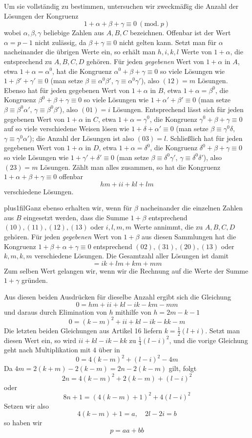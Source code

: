 Um sie vollständig zu bestimmen, untersuchen wir zweckmäßig die Anzahl der Lösungen der Kongruenz
\[
1+\alpha+\beta+\gamma\equiv0\ (\mathrm{mod.}\ p)
\]
wobei $\alpha,\beta,\gamma$ beliebige Zahlen aus $A,B,C$ bezeichnen. Offenbar ist der Wert $\alpha=p-1$ nicht zulässig, da $\beta+\gamma\equiv0$ nicht gelten kann. Setzt man für $\alpha$ nacheinander die übrigen Werte ein, so erhält man $h,i,k,l$ Werte von $1+\alpha$, die entsprechend zu $A,B,C,D$ gehören. Für jeden \emph{gegebenen} Wert von $1+\alpha$ in $A$, etwa $1+\alpha=\alpha^0$, hat die Kongruenz $\alpha^0+\beta+\gamma\equiv0$ so viele Lösungen wie $1+\beta'+\gamma'\equiv0$ (man setze $\beta\equiv\alpha^0\beta'$, $\gamma\equiv\alpha^0\gamma'$), also $(12)=m$ Lösungen. Ebenso hat für jeden gegebenen Wert von $1+\alpha$ in $B$, etwa $1+\alpha=\beta^0$, die Kongruenz $\beta^0+\beta+\gamma\equiv0$ so viele Lösungen wie $1+\alpha'+\beta'\equiv0$ (man setze $\beta\equiv\beta^0\alpha'$, $\gamma\equiv\beta^0\beta'$), also $(01)=i$ Lösungen. Entsprechend lässt sich für jeden gegebenen Wert von $1+\alpha$ in $C$, etwa $1+\alpha=\gamma^0$, die Kongruenz $\gamma^0+\beta+\gamma\equiv0$ auf so viele verschiedene Weisen lösen wie $1+\delta+\alpha'\equiv0$ (man setze $\beta\equiv\gamma^0\delta$, $\gamma\equiv\gamma^0\alpha'$); die Anzahl der Lösungen ist also $(03)=l$. Schließlich hat für jeden gegebenen Wert von $1+\alpha$ in $D$, etwa $1+\alpha=\delta^0$, die Kongruenz $\delta^0+\beta+\gamma\equiv0$ so viele Lösungen wie $1+\gamma'+\delta'\equiv0$ (man setze $\beta\equiv\delta^0\gamma'$, $\gamma\equiv\delta^0\delta'$), also $(23)=m$ Lösungen. Zählt man alles zusammen, so hat die Kongruenz $1+\alpha+\beta+\gamma\equiv0$ offenbar
\[
hm+ii+kl+lm
\]
verschiedene Lösungen.

\begingroup\rightskip=0pt plus1fil\relax Ganz ebenso erhalten wir, wenn für $\beta$ nacheinander die einzelnen Zahlen aus $B$ eingesetzt werden, dass die Summe $1+\beta$ entsprechend $(10),(11),(12),(13)$ oder $i,l,m,m$ Werte annimmt, die zu $A,B,C,D$ gehören. Für jeden \emph{gegebenen} Wert von $1+\beta$ aus diesen Sammlungen hat die Kongruenz $1+\beta+\alpha+\gamma\equiv0$ entsprechend $(02),(31),(20),(13)$ oder $k,m,k,m$ verschiedene Lösungen. Die Gesamtzahl aller Lösungen ist damit
%
\[
=ik+lm+km+mm
\]
Zum selben Wert gelangen wir, wenn wir die Rechnung auf die Werte der Summe $1+\gamma$ gründen.\par\endgroup

Aus diesen beiden Ausdrücken für dieselbe Anzahl ergibt sich die Gleichung
\[
0=hm+ii+kl-ik-km-mm
\]
und daraus durch Elimination von $h$ mithilfe von $h=2m-k-1$
\[
0=(k-m)^2+ii+kl-ik-kk-m
\]
Die letzten beiden Gleichungen aus Artikel 16 liefern $k=\frac12(l+i)$. Setzt man diesen Wert ein, so wird $ii+kl-ik-kk$ zu $\frac14(l-i)^2$, und die vorige Gleichung geht nach Multiplikation mit $4$ über in
\[
0=4(k-m)^2+(l-i)^2-4m
\]
Da $4m=2(k+m)-2(k-m)=2n-2(k-m)$ gilt, folgt
\[
2n=4(k-m)^2+2(k-m)+(l-i)^2
\]
oder
\[
8n+1=(4(k-m)+1)^2+4(l-i)^2
\]
Setzen wir also
\[
4(k-m)+1=a,\quad2l-2i=b
\]
so haben wir
\[
p=aa+bb
\]

